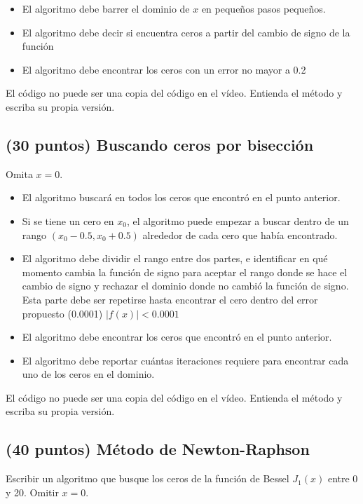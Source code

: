 \documentclass{article}
\begin{document}
\begin{itemize}
\item El algoritmo debe barrer el dominio de $x$ en pequeños pasos pequeños.
\item El algoritmo debe decir si encuentra ceros a partir del cambio de
  signo de la función
\item El algoritmo debe encontrar los ceros con un error no mayor a 0.2
\end{itemize}

El c\'odigo no puede ser una copia del código en el vídeo. 
Entienda el método y escriba su propia versión.

\subsection{(30 puntos) Buscando ceros por bisección}
Omita $x=0$.

\begin{itemize}
\item El algoritmo buscará en todos los ceros que encontró en el punto anterior.
\item Si se tiene un cero en $x_0$, el algoritmo  puede empezar a buscar
  dentro de un rango $(x_0 - 0.5 , x_0 + 0.5)$
  alrededor de cada cero que había encontrado.  
\item El algoritmo debe dividir el rango entre dos partes, e identificar
  en qué momento cambia la función de signo para aceptar el rango
  donde se hace el cambio de signo y rechazar el dominio donde no
  cambió la función de signo. Esta parte debe ser repetirse hasta
  encontrar el cero dentro del error propuesto (0.0001)
  $|f(x)| < 0.0001$
\item El algoritmo debe encontrar los ceros que encontró en el punto
  anterior.
\item El algoritmo debe reportar cuántas iteraciones requiere para
  encontrar cada uno de los ceros en el dominio.
\end{itemize}

El c\'odigo no puede ser una copia del código en el vídeo. 
Entienda el método y escriba su propia versión.


\subsection{(40 puntos) Método de Newton-Raphson}

Escribir un algoritmo que busque los ceros de la función de Bessel
$J_1(x)$ entre 0 y 20. Omitir $x=0$.
\end{document}
